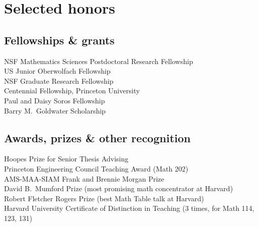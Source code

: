 \documentclass[11pt]{article} %
\begin{document}
\vspace*{-3pt}
\section*{Selected honors}

\subsection*{Fellowships \& grants}

 NSF Mathematics Sciences Postdoctoral Research Fellowship \\
 US Junior Oberwolfach Fellowship \\
 NSF Graduate Research Fellowship \\
 Centennial Fellowship, Princeton University \\
 Paul and Daisy Soros Fellowship \\
 Barry M.~Goldwater Scholarship

\subsection*{Awards, prizes \& other recognition}

 Hoopes Prize for Senior Thesis Advising \\
 Princeton Engineering Council Teaching Award (Math 202) \\
 AMS-MAA-SIAM Frank and Brennie Morgan Prize\\
 David B.~Mumford Prize (most promising math concentrator at Harvard)\\
 Robert Fletcher Rogers Prize (best Math Table talk at Harvard) \\
 Harvard University Certificate of Distinction in Teaching (3 times, for Math 114, 123, 131) \\
\end{document}
